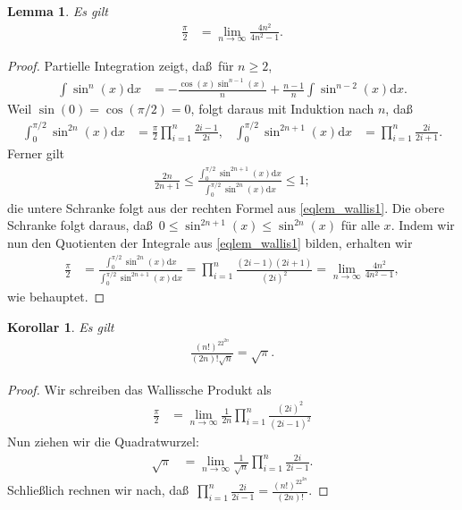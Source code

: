 \documentclass[10pt,reqno]{amsart}
\numberwithin{equation}{section}
\newcommand\dd{{\mathrm d}}
\newtheorem{lemma}[definition]{Lemma}
\newtheorem{corollary}[definition]{Korollar}
\begin{document}
\begin{lemma}\label{lem_wallis}
	Es gilt
	\begin{align*}
		\frac{\pi}2&=\lim_{n\to\infty}\frac{4n^2}{4n^2-1}.
	\end{align*}
\end{lemma}
\begin{proof}
	Partielle Integration zeigt, da\ss\ f\"ur $n\geq2$,
	\begin{align*}
		\int\sin^n(x)\dd x&=-\frac{\cos(x)\sin^{n-1}(x)}n+\frac{n-1}n\int\sin^{n-2}(x)\dd x. %
	\end{align*}
	Weil $\sin(0)=\cos(\pi/2)=0$, folgt daraus mit Induktion nach $n$, da\ss
	\begin{align}\label{eqlem_wallis1}
		\int_0^{\pi/2}\sin^{2n}(x)\dd x&=\frac\pi2\prod_{i=1}^n\frac{2i-1}{2i},&
		\int_0^{\pi/2}\sin^{2n+1}(x)\dd x&=\prod_{i=1}^n\frac{2i}{2i+1}.
	\end{align}
	Ferner gilt
	\begin{align*}
		\frac{2n}{2n+1}\leq\frac{\int_0^{\pi/2}\sin^{2n+1}(x)\dd x}{\int_0^{\pi/2}\sin^{2n}(x)\dd x}\leq1;
	\end{align*}
	die untere Schranke folgt aus der rechten Formel aus \eqref{eqlem_wallis1}.
	Die obere Schranke folgt daraus, da\ss\ $0\leq \sin^{2n+1}(x)\leq\sin^{2n}(x)$ f\"ur alle $x$.
	Indem wir nun den Quotienten der Integrale aus \eqref{eqlem_wallis1} bilden, erhalten wir
	\begin{align*}
		\frac\pi2&=\frac{\int_0^{\pi/2}\sin^{2n}(x)\dd x}{\int_0^{\pi/2}\sin^{2n+1}(x)\dd x}=\prod_{i=1}^n\frac{(2i-1)(2i+1)}{(2i)^2}=\lim_{n\to\infty}\frac{4n^2}{4n^2-1},
	\end{align*}
	wie behauptet.
\end{proof}

\begin{corollary}\label{cor_wallis}
Es gilt
\begin{align*}
	\frac{(n!)^22^{2n}}{(2n)!\sqrt n}=\sqrt\pi.
\end{align*}
\end{corollary}
\begin{proof}
	Wir schreiben das Wallissche Produkt als
	\begin{align*}
		\frac\pi2&=\lim_{n\to\infty}\frac1{2n}\prod_{i=1}^n\frac{(2i)^2}{(2i-1)^2}
	\end{align*}
	Nun ziehen wir die Quadratwurzel:
	\begin{align*}
		\sqrt{\pi}&=\lim_{n\to\infty}\frac1{\sqrt{n}}\prod_{i=1}^n\frac{2i}{2i-1}.
	\end{align*}
	Schlie\ss lich rechnen wir nach, da\ss\ $\prod_{i=1}^n\frac{2i}{2i-1}=\frac{(n!)^22^{2n}}{(2n)!}$.
\end{proof}
\end{document}
